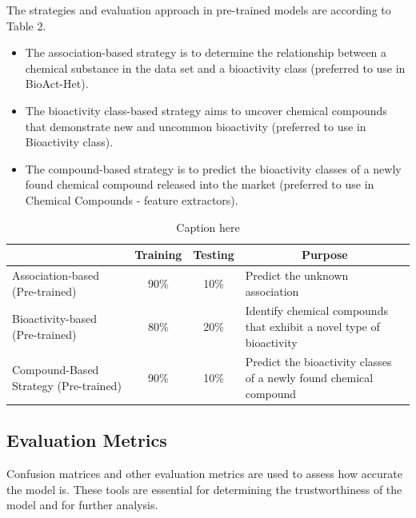 \documentclass[conference]{IEEEtran}
\begin{document}
The strategies and evaluation approach in pre-trained models are according to Table 2.\\

\begin{itemize}
  \item The association-based strategy is to determine the relationship between a chemical substance in the data set and a bioactivity class (preferred to use in BioAct-Het).
  \item The bioactivity class-based strategy aims to uncover chemical compounds that demonstrate new and uncommon bioactivity (preferred to use in Bioactivity class).
  \item The compound-based strategy is to predict the bioactivity classes of a newly found chemical compound released into the market (preferred to use in Chemical Compounds - feature extractors).
\end{itemize}

\begin{table}[h!]
  \caption{Caption here}
  \label{tab:your_label_here}
  \centering
  \begin{tabular}{|m{2.2cm}|c|c|m{2.8cm}|}
    \hline
    \rowcolor{headercolor}
    \multicolumn{1}{|c|}{\textbf{Category}}        & \multicolumn{1}{c|}{\textbf{Training}} & \multicolumn{1}{c|}{\textbf{Testing}} & \multicolumn{1}{c|}{\textbf{Purpose}}                                \\ \hline
    Association-based \newline (Pre-trained)       & 90\%                                   & 10\%                                  & Predict the unknown \newline association                             \\ \hline
    Bioactivity-based \newline (Pre-trained)       & 80\%                                   & 20\%                                  & Identify chemical compounds that exhibit a novel type of bioactivity \\ \hline
    Compound-Based Strategy \newline (Pre-trained) & 90\%                                   & 10\%                                  & Predict the bioactivity classes of a newly found chemical compound   \\ \hline
  \end{tabular}
\end{table}

\subsection{Evaluation Metrics}
Confusion matrices and other evaluation metrics are used to assess how accurate the model is. These tools are essential for determining the trustworthiness of the model and for further analysis.
\end{document}
